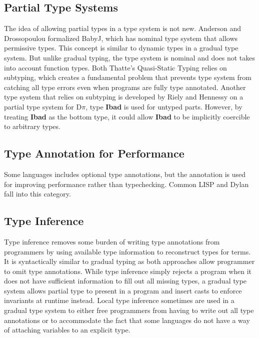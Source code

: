 \subsection{Partial Type Systems}
The idea of allowing partial types in a type system is not new.
Anderson and Drossopoulou formalized BabyJ\cite{anderson2003babyj}, which has
nominal type system that allows permissive types.
This concept is similar to dynamic types in a gradual type system.
But unlike gradual typing, the type system is nominal and does not takes into account function types.
Both Thatte's Quasi-Static Typing\cite{thatte1989quasi} relies on subtyping,
which creates a fundamental problem that prevents type system from catching all type errors even when programs are
fully type annotated.
Another type system that relies on subtyping
is developed by Riely and Hennessy\cite{riely1999trust} on a partial type system for D$\pi$,
type \textbf{Ibad} is used for untyped parts. However, by treating \textbf{Ibad} as the bottom type,
it could allow \textbf{Ibad} to be implicitly coercible to arbitrary types.

\subsection{Type Annotation for Performance}
Some languages includes optional type annotations, but
the annotation is used for improving performance rather than
typechecking.
Common LISP\cite{steele1982overview}
and Dylan\cite{feinberg1996dylan,shalit1996dylan} fall into this category.

\subsection{Type Inference}
Type inference \cite{damas1982principal,hindley1969principle,milner1978theory}
removes some burden of writing type annotations from programmers
by using available type information to reconstruct types for terms.
It is syntactically similar to gradual typing as both approaches
allow programmer to omit type annotations.
While type inference simply rejects a program when it
does not have sufficient information to fill out all missing types,
a gradual type system allows partial type to present in a program and insert casts
to enforce invariants at runtime instead.
Local type inference \cite{pierce2000local} sometimes are used in a gradual type
system to either free programmers from having to write out all type annotations
or to accommodate the fact that some languages do not have a way of attaching
variables to an explicit type.


